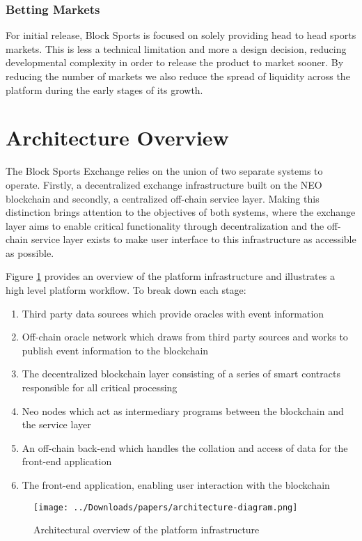 \documentclass{article}
\begin{document}
		\subsubsection{Betting Markets}
For initial release, Block Sports is focused on solely providing head to head sports markets. This is less a technical limitation and more a design decision, reducing developmental complexity in order to release the product to market sooner. By reducing the number of markets we also reduce the spread of liquidity across the platform during the early stages of its growth.

\section{Architecture Overview}
The Block Sports Exchange relies on the union of two separate systems to operate. Firstly, a decentralized exchange infrastructure built on the NEO blockchain and secondly, a centralized  off-chain service layer. Making this distinction brings attention to the objectives of both systems, where the exchange layer aims to enable critical functionality through decentralization and the off-chain service layer exists to make user interface to this infrastructure as accessible as possible.  

Figure \ref{figure:architecture} provides an overview of the platform infrastructure and illustrates a high level platform workflow. To break down each stage:
\begin{enumerate}[label=(\alph*)]
	\item Third party data sources which provide oracles with event information
	\item Off-chain oracle network which draws from third party sources and works to publish event information to the blockchain 
	\item The decentralized blockchain layer consisting of a series of smart contracts responsible for all critical processing
	\item Neo nodes which act as intermediary programs between the blockchain and the service layer
	\item An off-chain back-end which handles the collation and access of data for the front-end application
	\item The front-end application, enabling user interaction with the blockchain
\end{enumerate}

\begin{figure}[!htb]
\centering
\texttt{[image: ../Downloads/papers/architecture-diagram.png]} 
\caption{Architectural overview of the platform infrastructure}
\label{figure:architecture}
\end{figure}
\end{document}
